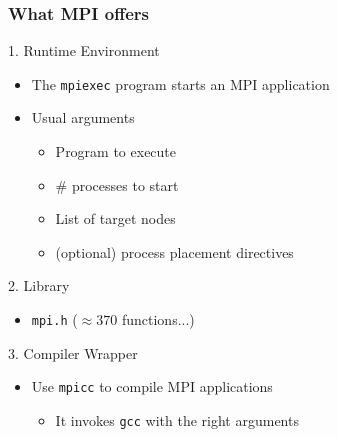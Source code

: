 \documentclass[xcolor={x11names,svgnames,psnames}]{beamer}
\begin{document}
\begin{frame}
  \frametitle{What MPI offers}

  \begin{alertblock}{1. Runtime Environment}
    \begin{itemize}
    \item The \texttt{mpiexec} program starts an MPI application
    \item Usual arguments
      \begin{itemize}
      \item Program to execute
      \item \# processes to start
      \item List of target nodes
      \item (optional) process placement directives
      \end{itemize}
    \end{itemize}
  \end{alertblock}

  \medskip
  
  \begin{exampleblock}{2. Library}
    \begin{itemize}
    \item \texttt{mpi.h} ($\approx 370$ functions...)
    \end{itemize}
  \end{exampleblock}

  \medskip

  \begin{block}{3. Compiler Wrapper}
    \begin{itemize}
    \item Use \texttt{mpicc} to compile MPI applications
      \begin{itemize}
      \item It invokes \texttt{gcc} with the right arguments 
      \end{itemize}
    \end{itemize}
  \end{block}
\end{frame}

\end{document}
